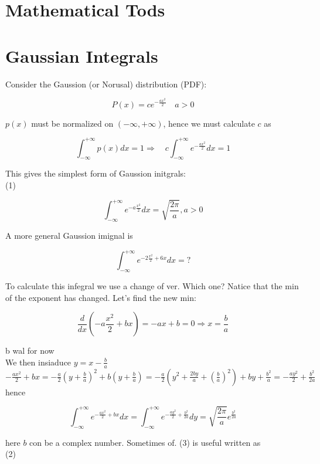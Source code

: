 \documentclass[10pt]{article}
\begin{document}
\section*{Mathematical Tods}
\section*{Gaussian Integrals}
Consider the Gaussion (or Norusal) distribution (PDF):

$$
P(x)=c e^{-\frac{a x^{2}}{2}} \quad a>0
$$

$p(x)$ must be normalized on $(-\infty,+\infty)$, hence we must calculate $c$ as

$$
\int_{-\infty}^{+\infty} p(x) d x=1 \Rightarrow \quad c \int_{-\infty}^{+\infty} e^{-\frac{a x^{2}}{2}} d x=1
$$

This gives the simplest form of Gaussion initgrals:\\
(1)

$$
\int_{-\infty}^{+\infty} e^{-a \frac{x^{2}}{2}} d x=\sqrt{\frac{2 \pi}{a}}, a>0
$$

A more general Gaussion imignal is


\begin{equation*}
\int_{-\infty}^{+\infty} e^{-2 \frac{x^{2}}{2}+6 x} d x=? \tag{2}
\end{equation*}


To calculate this infegral we use a change of ver. Which one? Natice that the min of the exponent has changed. Let's find the new min:

$$
\frac{d}{d x}\left(-a \frac{x^{2}}{2}+b x\right)=-a x+b=0 \Rightarrow x=\frac{b}{a}
$$

b wal for now\\
We then insiaduce $y=x-\frac{b}{a}$\\
$-\frac{a x^{2}}{2}+b x=-\frac{a}{2}\left(y+\frac{b}{a}\right)^{2}+b\left(y+\frac{b}{a}\right)=-\frac{a}{2}\left(y^{2}+\frac{2 b y}{a}+\left(\frac{b}{a}\right)^{2}\right)+b y+\frac{b^{2}}{a}=-\frac{a y^{2}}{2}+\frac{b^{2}}{2 a}$ hence


\begin{equation*}
\int_{-\infty}^{+\infty} e^{-\frac{a x^{2}}{2}+b x} d x=\int_{-\infty}^{+\infty} e^{-\frac{a y^{2}}{2}+\frac{b^{2}}{2 a}} d y=\sqrt{\frac{2 \pi}{a}} e^{\frac{b^{2}}{2 a}} \tag{3}
\end{equation*}


here $b$ con be a complex number. Sometimes of. (3) is useful written as\\
(2)
\end{document}
